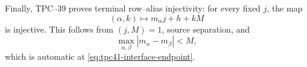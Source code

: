 Finally, TPC--39 proves terminal row--alias injectivity: for every fixed
\(j\), the map
\begin{equation}
 (\alpha,k)\longmapsto m_\alpha j+h+kM
 \label{eq:tpc41-interface-injectivity}
\end{equation}
is injective.  This follows from \((j,M)=1\), source separation, and
\begin{equation}
 \max_{\alpha,\beta}|m_\alpha-m_\beta|<M,
 \label{eq:tpc41-interface-row-gap}
\end{equation}
which is automatic at \eqref{eq:tpc41-interface-endpoint}.
